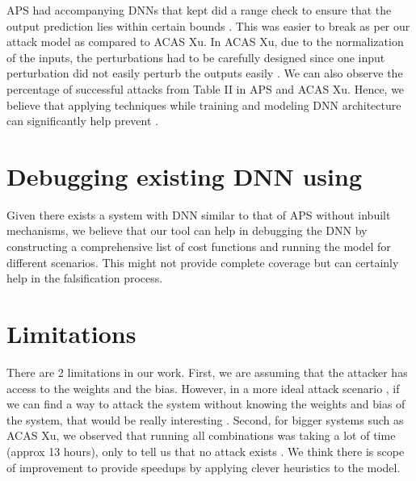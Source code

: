 APS had accompanying DNNs that kept did a range check to ensure that the output prediction lies within certain bounds . 
This was easier to break as per our attack model as compared to ACAS Xu. 
In ACAS Xu, due to the normalization of the inputs, the perturbations had to be carefully designed since one input perturbation did not easily perturb the outputs easily . 
We can also observe the percentage of successful attacks from Table II  in APS and ACAS Xu. 
Hence, we believe that applying techniques while training and modeling DNN architecture can significantly help prevent \attack. 

\section{Debugging existing DNN using \tool}
Given there exists a system with DNN similar to that of APS without inbuilt mechanisms, we believe that our tool can help in debugging the DNN by constructing a comprehensive list of cost functions and running the model for different scenarios. This might not provide complete coverage but can certainly help in the falsification process. 

\section{ Limitations}

There are 2 limitations in our work.
First, we are assuming that the attacker has access to the weights and the bias. However, in a more ideal attack scenario , if we  can find a way to  attack the system without knowing the weights and bias of the system, that would be really interesting . %
Second, for bigger systems such as ACAS Xu, we observed that running all combinations was taking a lot of time (approx 13 hours), only to tell us that no attack exists . We think there is scope of improvement to provide speedups by applying clever heuristics to the model. 


